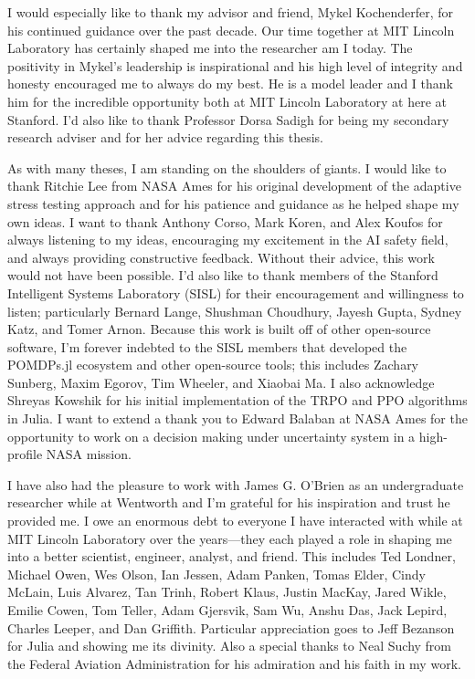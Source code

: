 I would especially like to thank my advisor and friend, Mykel Kochenderfer, for his continued guidance over the past decade.
Our time together at MIT Lincoln Laboratory has certainly shaped me into the researcher am I today.
The positivity in Mykel's leadership is inspirational and his high level of integrity and honesty encouraged me to always do my best.
He is a model leader and I thank him for the incredible opportunity both at MIT Lincoln Laboratory at here at Stanford.
I'd also like to thank Professor Dorsa Sadigh for being my secondary research adviser and for her advice regarding this thesis.

As with many theses, I am standing on the shoulders of giants.
I would like to thank Ritchie Lee from NASA Ames for his original development of the adaptive stress testing approach and for his patience and guidance as he helped shape my own ideas.
I want to thank Anthony Corso, Mark Koren, and Alex Koufos for always listening to my ideas, encouraging my excitement in the AI safety field, and always providing constructive feedback. Without their advice, this work would not have been possible.
I'd also like to thank members of the Stanford Intelligent Systems Laboratory (SISL) for their encouragement and willingness to listen; particularly Bernard Lange, Shushman Choudhury, Jayesh Gupta, Sydney Katz, and Tomer Arnon.
Because this work is built off of other open-source software, I'm forever indebted to the SISL members that developed the POMDPs.jl ecosystem and other open-source tools; this includes Zachary Sunberg, Maxim Egorov, Tim Wheeler, and Xiaobai Ma.
I also acknowledge Shreyas Kowshik for his initial implementation of the TRPO and PPO algorithms in Julia.
I want to extend a thank you to Edward Balaban at NASA Ames for the opportunity to work on a decision making under uncertainty system in a high-profile NASA mission.

I have also had the pleasure to work with James G. O'Brien as an undergraduate researcher while at Wentworth and I'm grateful for his inspiration and trust he provided me. I owe an enormous debt to everyone I have interacted with while at MIT Lincoln Laboratory over the years---they each played a role in shaping me into a better scientist, engineer, analyst, and friend. This includes Ted Londner, Michael Owen, Wes Olson, Ian Jessen, Adam Panken, Tomas Elder, Cindy McLain, Luis Alvarez, Tan Trinh, Robert Klaus, Justin MacKay, Jared Wikle, Emilie Cowen, Tom Teller, Adam Gjersvik, Sam Wu, Anshu Das, Jack Lepird, Charles Leeper, and Dan Griffith. Particular appreciation goes to Jeff Bezanson for Julia and showing me its divinity. Also a special thanks to Neal Suchy from the Federal Aviation Administration for his admiration and his faith in my work.

